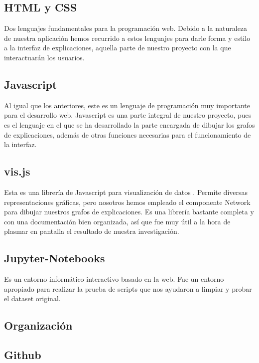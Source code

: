 \subsection*{HTML y CSS}

Dos lenguajes fundamentales para la programación web. Debido a la naturaleza de nuestra aplicación hemos recurrido a estos lenguajes para darle forma y estilo a la interfaz de explicaciones, aquella parte de nuestro proyecto con la que interactuarán los usuarios.

\subsection*{Javascript}

Al igual que los anteriores, este es un lenguaje de programación muy importante para el desarrollo web. Javascript es una parte integral de nuestro proyecto, pues es el lenguaje en el que se ha desarrollado la parte encargada de dibujar los grafos de explicaciones, además de otras funciones necesarias para el funcionamiento de la interfaz.

\subsection*{vis.js}

Esta es una librería de Javascript para visualización de datos  \cite{visjs}. Permite diversas representaciones gráficas, pero nosotros hemos empleado el componente Network para dibujar nuestros grafos de explicaciones. Es una librería bastante completa y con una documentación bien organizada, así que fue muy útil a la hora de plasmar en pantalla el resultado de nuestra investigación.

\subsection*{Jupyter-Notebooks}

Es un entorno informático interactivo basado en la web. Fue un entorno apropiado para realizar la prueba de scripts que nos ayudaron a limpiar y probar el dataset original.

\subsection{Organización}

\subsection*{Github}

